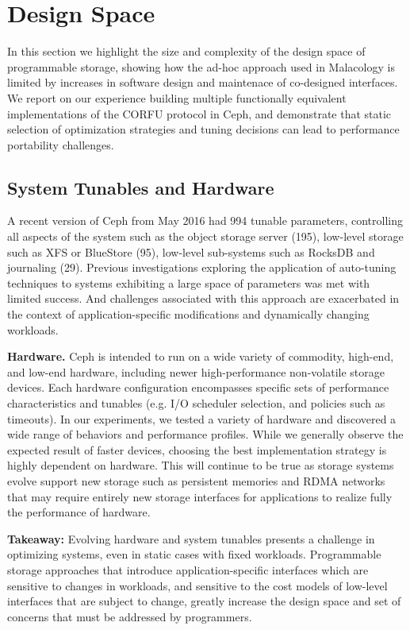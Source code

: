 \section{Design Space}
\label{sec:dspace}

In this section we highlight the size and complexity of the design space of
programmable storage, showing how the ad-hoc approach used in Malacology is
limited by increases in software design and maintenace of co-designed
interfaces. We report on our experience building multiple functionally
equivalent implementations of the CORFU protocol in Ceph, and demonstrate that
static selection of optimization strategies and tuning decisions can lead to
performance portability challenges.

\subsection{System Tunables and Hardware}

A recent version of Ceph from May 2016 had 994 tunable parameters, controlling
all aspects of the system such as the object storage server (195), low-level
storage such as XFS or BlueStore (95), low-level sub-systems such as RocksDB
and journaling (29). Previous investigations exploring the application of
auto-tuning~\cite{behzad:sc2013-autotuning} techniques to systems exhibiting a
large space of parameters was met with limited success. And challenges
associated with this approach are exacerbated in the context of
application-specific modifications and dynamically changing workloads.

{\bf Hardware.} Ceph is intended to run on a wide variety of commodity,
high-end, and low-end hardware, including newer high-performance non-volatile
storage devices. Each hardware configuration encompasses specific sets of
performance characteristics and tunables (e.g. I/O scheduler selection, and
policies such as timeouts). In our experiments, we tested a variety of
hardware and discovered a wide range of behaviors and performance profiles.
While we generally observe the expected result of faster devices, choosing the
best implementation strategy is highly dependent on hardware. This will
continue to be true as storage systems evolve support new storage such as
persistent memories and RDMA networks that may require entirely new storage
interfaces for applications to realize fully the performance of hardware.

\textbf{Takeaway:} Evolving hardware and system tunables presents a challenge
in optimizing systems, even in static cases with fixed workloads. Programmable
storage approaches that introduce application-specific interfaces which are
sensitive to changes in workloads, and sensitive to the cost models of
low-level interfaces that are subject to change, greatly increase the design
space and set of concerns that must be addressed by programmers.

